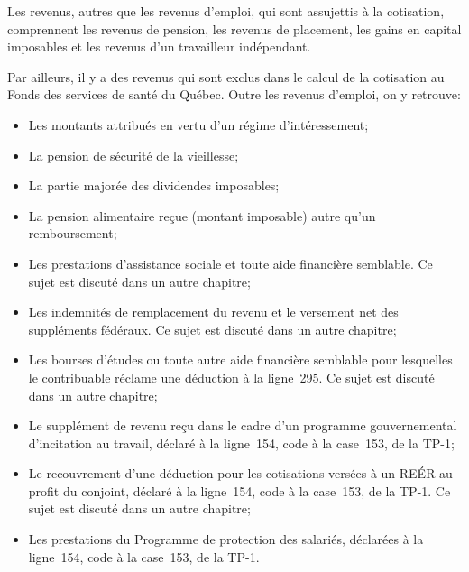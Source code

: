 Les revenus, autres que les revenus d'emploi, qui sont assujettis à la cotisation, comprennent les revenus de pension, les revenus de placement, les gains en capital imposables et les revenus d'un travailleur indépendant.

Par ailleurs, il y a des revenus qui sont exclus dans le calcul de la cotisation au Fonds des services de santé du Québec. Outre les revenus d'emploi, on y retrouve:
\begin{itemize}
	\item Les montants attribués en vertu d'un régime d'intéressement;
	\item La pension de sécurité de la vieillesse;
	\item La partie majorée des dividendes imposables;
	\item La pension alimentaire reçue (montant imposable) autre qu'un remboursement;
	\item Les prestations d'assistance sociale et toute aide financière semblable. Ce sujet est discuté dans un autre chapitre;
	\item Les indemnités de remplacement du revenu et le versement net des suppléments fédéraux. Ce sujet est discuté dans un autre chapitre;
	\item Les bourses d'études ou toute autre aide financière semblable pour lesquelles le contribuable réclame une déduction à la ligne~295. Ce sujet est discuté dans un autre chapitre;
	\item Le supplément de revenu reçu dans le cadre d'un programme gouvernemental d'incitation au travail, déclaré à la ligne~154, code  \fg{} à la case~153, de la TP-1;
	\item Le recouvrement d'une déduction pour les cotisations versées à un REÉR au profit du conjoint, déclaré à la ligne~154, code  \fg{} à la case~153, de la TP-1. Ce sujet est discuté dans un autre chapitre;
	\item Les prestations du Programme de protection des salariés, déclarées à la ligne~154, code  \fg{} à la case~153, de la TP-1.
\end{itemize}

